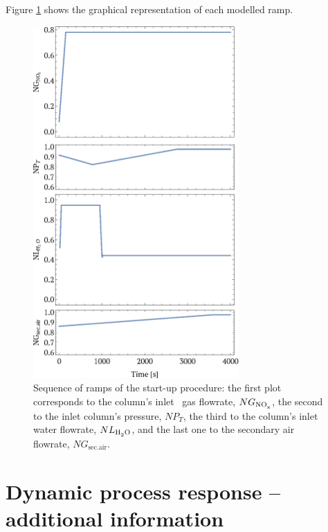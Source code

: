 \documentclass[journal=jacsat,manuscript=article]{achemso}
\newcommand{\nox}{\ce{NO_{\rmfamily{x}}}}
\newcommand{\hdoiso}{\ce{H2O}}
\begin{document}
Figure \ref{fig:modelall} shows the graphical representation of each modelled ramp. 


\begin{figure}[htb]
	\centering
	\includegraphics[width=0.7\textwidth]{figure2sp.eps}
	\caption[Sequence of ramps of the start-up procedure.]{Sequence of ramps of the start-up procedure: the first plot corresponds to the column's inlet \nox~gas flowrate, $NG_{\text{\nox}}$, the second to the inlet column's pressure, $NP_T$, the third to the column's inlet water flowrate, $NL_{\text{\hdoiso}}$, and the last one to the secondary air flowrate, $NG_{\text{sec.air}}$.} 
	\label{fig:modelall}
\end{figure}

\section{Dynamic process response -- additional information}
\label{s2:SI}
\end{document}

